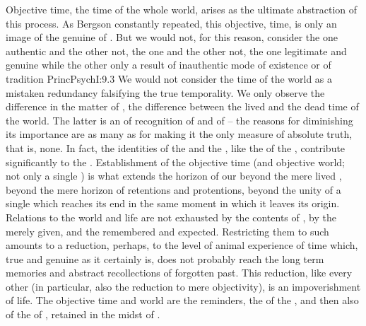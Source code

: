 Objective time, the time of the whole world, arises as the ultimate abstraction
of this  process. As Bergson constantly repeated, this objective,
 time, is only an image of the genuine  of
. But we would not, for this reason, consider the one authentic
and the other not, the one  and the other not, the one
legitimate and genuine while the other only a result of inauthentic mode of
existence or of tradition \citet{engulfing all [the] delicate idiosyncrasies in
  its monotonous sound.}{PrincPsych}{I:9.3} We would not consider the time of
the world as a mistaken redundancy falsifying the true temporality. We only
observe the difference in the matter of , the difference between
the lived  and the dead time of the 
world. The latter is an  of recognition of  and of
 -- the reasons for diminishing its importance are as
many as for making it the only measure of absolute truth, that is, none.  In
fact, the identities of the  and the  , like
the  of the , contribute significantly to the
.  Establishment of the objective time (and objective
world; not only a single ) is what extends the horizon of our
 beyond the mere lived , beyond the mere horizon of
retentions and protentions, beyond the unity of a single  which reaches
its end in the same moment in which it leaves its origin.  Relations to the
world and life are not exhausted by the contents of ,
by the merely  given, and the  remembered and
expected. Restricting them to such  amounts to a reduction,
perhaps, to the level of animal experience of time which, true and genuine as it
certainly is, does not probably reach the long term memories and abstract
recollections of forgotten past. This reduction, like every other (in
particular, also the reduction to mere objectivity), is an impoverishment of
life.  The objective time and world are the reminders, the  of the
, and then also of the  of , retained in the midst of .



